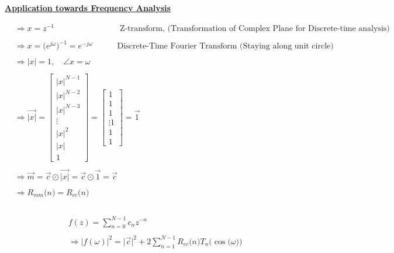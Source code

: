 \documentclass{article}
\begin{document}
\textbf{\underline{Application towards Frequency Analysis}}

\begin{align*}
    & \Rightarrow x = z^{-1} \quad \quad \quad \quad \quad \quad \quad \quad \text{Z-transform, (Transformation of Complex Plane for Discrete-time analysis)} \\ \\
    & \Rightarrow x = \big(e^{j\omega}\big)^{-1} = e^{-j\omega} \quad \quad \quad \text{Discrete-Time Fourier Transform (Staying along unit circle)} \\ \\
    & \Rightarrow |x| = 1, \quad \angle{x} = \omega \\ \\
    & \Rightarrow \vec{|x|} = \begin{bmatrix}
                                    |x|^{N - 1} \\
                                    |x|^{N - 2} \\
                                    |x|^{N - 3} \\
                                    \vdots \\
                                    |x|^{2} \\
                                    |x| \\
                                    1
                                \end{bmatrix}
                            = \begin{bmatrix}
                                    1 \\
                                    1 \\
                                    1 \\
                                    \vdots
                                    1 \\
                                    1 \\
                                    1
                                \end{bmatrix} = \vec{1} \\ \\
    & \Rightarrow \vec{m} = \vec{c} \odot \vec{|x|} = \vec{c} \odot \vec{1} = \vec{c} \\ \\
    & \Rightarrow R_{mm}\big(n\big) = R_{cc}\big(n\big)
\end{align*}

\begin{align*}
    & \\ \\
    & f(z) = \sum_{n = 0}^{N - 1}c_{n}z^{-n} \\ \\
    &\Rightarrow |f(\omega)|^{2} = \big|\vec{c}\big|^{2} + 2\sum_{n=1}^{N - 1}R_{cc}\big(n\big)T_{n}\Big(\cos\big(\omega\big)\Big) 
\end{align*}
\end{document}
